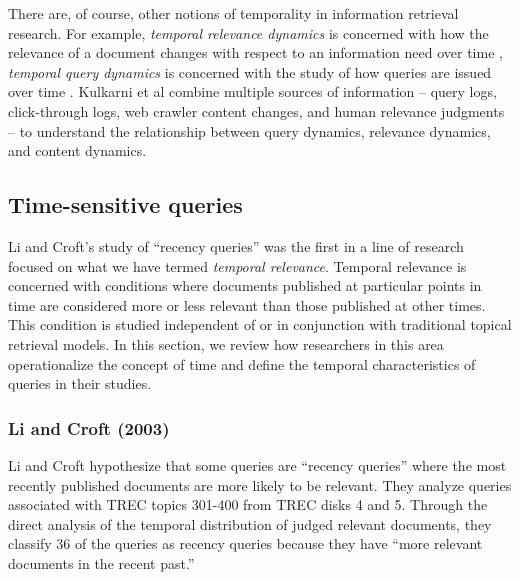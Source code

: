 \documentclass{sig-alternate}
\begin{document}
There are, of course, other notions of temporality in information retrieval research. For example, \emph{temporal relevance dynamics} is concerned with how the relevance of a document changes with respect to an information need over time \cite{Mizzaro1997},  \emph{temporal query dynamics} is concerned with the study of how queries are issued over time \cite{Shokouhi2011, Vlachos2005, Parikh2008, Lavrenko2000}. Kulkarni et al \cite{Kulkarni2011} combine multiple sources of information -- query logs, click-through logs, web crawler content changes, and human relevance judgments -- to understand the relationship between query dynamics, relevance dynamics, and content dynamics. 

\subsection{Time-sensitive queries}
Li and Croft's study of ``recency queries'' was the first in a line of research focused on what we have termed \emph{temporal relevance}. Temporal relevance is concerned with conditions where documents published at particular points in time are considered more or less relevant than those published at other times. This condition is studied independent of or in conjunction with traditional topical retrieval models. In this section, we review how researchers in this area operationalize the concept of time and define the temporal characteristics of queries in their studies. 

\subsubsection{Li and Croft (2003)}
Li and Croft \cite{Li2003} hypothesize that some queries are ``recency queries'' where the most recently published documents are more likely to be relevant. They analyze queries associated with TREC topics 301-400 from TREC disks 4 and 5. Through the direct analysis of the temporal distribution of judged relevant documents, they classify 36 of the queries as recency queries because they have ``more relevant documents in the recent past.''
\end{document}
